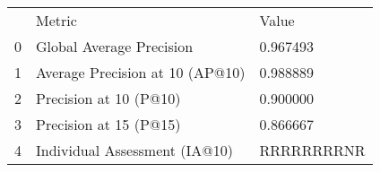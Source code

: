\begin{tabular}{lll}
 & Metric & Value \\
0 & Global Average Precision & 0.967493 \\
1 & Average Precision at 10 (AP@10) & 0.988889 \\
2 & Precision at 10 (P@10) & 0.900000 \\
3 & Precision at 15 (P@15) & 0.866667 \\
4 & Individual Assessment (IA@10) & RRRRRRRRNR \\
\end{tabular}

